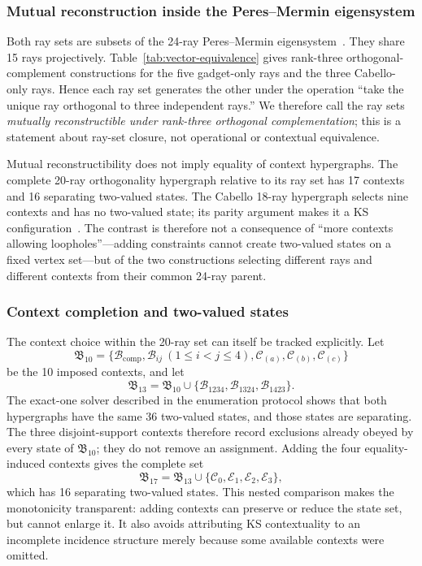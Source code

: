 \documentclass[%
  reprint,
  superscriptaddress,
  showpacs,
  showkeys,
  amsmath,amssymb,
  pra,
  longbibliography,
  floatfix,
  x11names
]{revtex4-2}
\newenvironment{revision}{\begingroup\color{revisionblue}}{\endgroup}
\begin{document}
\begin{revision}
\subsubsection{Mutual reconstruction inside the Peres--Mermin eigensystem}

Both ray sets are subsets of the 24-ray Peres--Mermin eigensystem~\cite{pavicic-2004ksafq,svozil-2024-convert-pra-externalfigures}.  They share 15 rays projectively.  Table~\ref{tab:vector-equivalence} gives rank-three orthogonal-complement constructions for the five gadget-only rays and the three Cabello-only rays.  Hence each ray set generates the other under the operation ``take the unique ray orthogonal to three independent rays.''  We therefore call the ray sets \emph{mutually reconstructible under rank-three orthogonal complementation}; this is a statement about ray-set closure, not operational or contextual equivalence.

Mutual reconstructibility does not imply equality of context hypergraphs.  The complete 20-ray orthogonality hypergraph relative to its ray set has 17 contexts and 16 separating two-valued states.  The Cabello 18-ray hypergraph selects nine contexts and has no two-valued state; its parity argument makes it a KS configuration~\cite{cabello-96}.  The contrast is therefore not a consequence of ``more contexts allowing loopholes''---adding constraints cannot create two-valued states on a fixed vertex set---but of the two constructions selecting different rays and different contexts from their common 24-ray parent.

\subsubsection{Context completion and two-valued states}

The context choice within the 20-ray set can itself be tracked explicitly.  Let
\[
\mathfrak{B}_{10}=\{\mathcal{B}_{\mathrm{comp}},\mathcal{B}_{ij}\ (1\leq i<j\leq4),
\mathcal{C}_{(a)},\mathcal{C}_{(b)},\mathcal{C}_{(c)}\}
\]
be the 10 imposed contexts, and let
\[
\mathfrak{B}_{13}=\mathfrak{B}_{10}\cup
\{\mathcal{B}_{1234},\mathcal{B}_{1324},\mathcal{B}_{1423}\}.
\]
The exact-one solver described in the enumeration protocol shows that both hypergraphs have the same 36 two-valued states, and those states are separating.  The three disjoint-support contexts therefore record exclusions already obeyed by every state of $\mathfrak{B}_{10}$; they do not remove an assignment.  Adding the four equality-induced contexts gives the complete set
\[
\mathfrak{B}_{17}=\mathfrak{B}_{13}\cup\{\mathcal{C}_0,\mathcal{E}_1,\mathcal{E}_2,\mathcal{E}_3\},
\]
which has 16 separating two-valued states.  This nested comparison makes the monotonicity transparent: adding contexts can preserve or reduce the state set, but cannot enlarge it.  It also avoids attributing KS contextuality to an incomplete incidence structure merely because some available contexts were omitted.


\end{revision}
\end{document}
